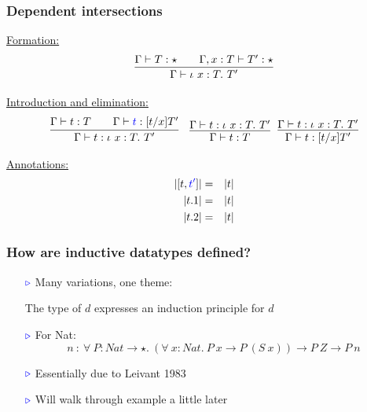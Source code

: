 \documentclass[11pt]{beamer}
\newcommand{\myb}[0]{\ensuremath{\textcolor{blue}{\triangleright}}}
\begin{document}
  
    

\begin{frame}
  \frametitle{Dependent intersections}

  \underline{Formation:}
  \[
  \infer{\Gamma\vdash \iota\ x:T.\ T'}{\Gamma\vdash T:\star \qquad \Gamma,x:T\vdash T':\star}
  \]

  \underline{Introduction and elimination:}
  \[
  \begin{array}{ll}
  \infer{\Gamma\vdash t : \iota\ x:T.\ T'}{\Gamma\vdash t : T \qquad \Gamma\vdash \textcolor{blue}{t} : [t/x]T'}
  &
  \infer{\Gamma\vdash t : T}{\Gamma\vdash t : \iota\ x:T.\ T'} \ \
  \infer{\Gamma\vdash t : [t/x]T'}{\Gamma\vdash t : \iota\ x:T.\ T'}
  \end{array}
  \]

  \underline{Annotations:}
  \begin{eqnarray*}
    |[t,\textcolor{blue}{t'}]| & = & |t| \\
    |t.1| & = & |t| \\
    |t.2| & = & |t|
  \end{eqnarray*}
\end{frame}

\begin{frame}
  \frametitle{How are inductive datatypes defined?}

  \begin{itemize}
  \item[$\myb$] Many variations, one theme:

    \vspace{.2cm}
    
{\color{blue}
    The type of $d$ expresses an induction principle for $d$ 
}

    \vspace{.2cm}


  \item[$\myb$] For Nat:
    \[
    n\ :\ \forall\ P : \textit{Nat} \to \star.\ (\forall\ x:\textit{Nat}.\ P\ x \to P\ (S\ x)) \to P\ Z \to P\ n
    \]
    
  \item[$\myb$] Essentially due to Leivant 1983
  \item[$\myb$] Will walk through example a little later
  \end{itemize}
\end{frame}
\end{document}
